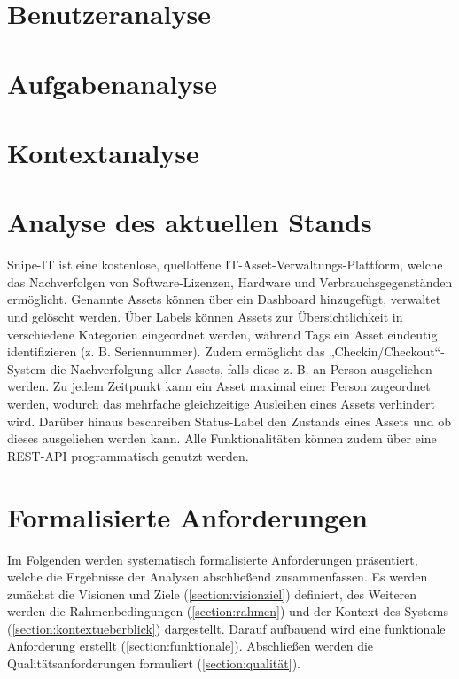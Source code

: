 \section{Benutzeranalyse}
\label{section:benutzer}

\section{Aufgabenanalyse}
\label{section:aufgaben}

\section{Kontextanalyse}
\label{section:kontext}

\section{Analyse des aktuellen Stands}
\label{section:iststand}

Snipe-IT ist eine kostenlose, quelloffene IT-Asset-Verwaltungs-Plattform,
welche das Nachverfolgen von Software-Lizenzen, Hardware und
Verbrauchsgegenständen ermöglicht. Genannte Assets können über ein Dashboard
hinzugefügt, verwaltet und gelöscht werden. Über Labels können Assets zur
Übersichtlichkeit in verschiedene Kategorien eingeordnet werden, während
Tags ein Asset eindeutig identifizieren (z. B. Seriennummer). Zudem ermöglicht
das „Checkin/Checkout“-System die Nachverfolgung aller Assets, falls diese
z. B.  an Person ausgeliehen werden. Zu jedem Zeitpunkt kann ein Asset
maximal einer Person zugeordnet werden, wodurch das mehrfache gleichzeitige
Ausleihen eines Assets verhindert wird. Darüber hinaus beschreiben Status-Label
den Zustands eines Assets und ob dieses ausgeliehen werden kann. Alle
Funktionalitäten können zudem über eine REST-API programmatisch genutzt werden.


\section{Formalisierte Anforderungen}
\label{section:anforderung}

Im Folgenden werden systematisch formalisierte Anforderungen präsentiert, welche die Ergebnisse der Analysen abschließend zusammenfassen.
Es werden zunächst die Visionen und Ziele (\ref{section:visionziel}) definiert, des Weiteren werden
die Rahmenbedingungen (\ref{section:rahmen}) und der Kontext des Systems
(\ref{section:kontextueberblick}) dargestellt. Darauf aufbauend wird eine funktionale Anforderung
erstellt (\ref{section:funktionale}). Abschließen werden die Qualitätsanforderungen formuliert
(\ref{section:qualität}).


